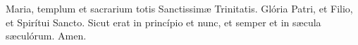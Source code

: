 Maria, templum et sacrarium totis Sanctissim{\ae} Trinitatis. Glória Patri, et Filio, et Spirítui Sancto. 
Sicut erat in princípio et nunc, et semper et in s{\ae}cula s{\ae}culórum. Amen.
